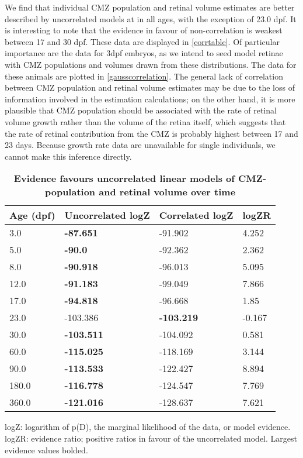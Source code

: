 We find that individual CMZ population and retinal volume estimates are better described by uncorrelated models at in all ages, with the exception of 23.0 dpf. It is interesting to note that the evidence in favour of non-correlation is weakest between 17 and 30 dpf. These data are displayed in \autoref{corrtable}. Of particular importance are the data for 3dpf embryos, as we intend to seed model retinae with CMZ populations and volumes drawn from these distributions. The data for these animals are plotted in \autoref{gausscorrelation}. The general lack of correlation between CMZ population and retinal volume estimates may be due to the loss of information involved in the estimation calculations; on the other hand, it is more plausible that CMZ population should be associated with the rate of retinal volume growth rather than the volume of the retina itself, which suggests that the rate of retinal contribution from the CMZ is probably highest between 17 and 23 days. Because growth rate data are unavailable for single individuals, we cannot make this inference directly.

\begin{table}[!ht]
    \centering
    \caption{{\bf Evidence favours uncorrelated linear models of CMZ-population and retinal volume over time}}
    \begin{tabular}{|l|l|l|l|}
        \hline
        {\bf Age (dpf)} & {\bf Uncorrelated logZ} & {\bf Correlated logZ} & {\bf logZR}\\ \hline
        3.0 & {\bf -87.651} & -91.902 & 4.252\\ \hline
        5.0 & {\bf -90.0} & -92.362 & 2.362\\ \hline
        8.0 & {\bf -90.918} & -96.013 & 5.095\\ \hline
        12.0 & {\bf -91.183} & -99.049 & 7.866\\ \hline
        17.0 & {\bf -94.818} & -96.668 & 1.85\\ \hline
        23.0 & -103.386 & {\bf -103.219} & -0.167\\ \hline
        30.0 & {\bf -103.511} & -104.092 & 0.581\\ \hline
        60.0 & {\bf -115.025} & -118.169 & 3.144\\ \hline
        90.0 & {\bf -113.533} & -122.427 & 8.894\\ \hline
        180.0 & {\bf -116.778} & -124.547 & 7.769\\ \hline
        360.0 & {\bf -121.016} & -128.637 & 7.621\\ \hline
        \end{tabular}
    \begin{flushleft} logZ: logarithm of p(D), the marginal likelihood of the data, or model evidence. logZR: evidence ratio; positive ratios in favour of the uncorrelated model. Largest evidence values bolded.
    \end{flushleft}
    \label{corrtable}
\end{table}

